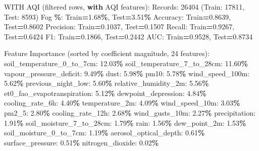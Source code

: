 \documentclass[
  letterpaper,
  DIV=11,
  numbers=noendperiod]{scrartcl}
\newenvironment{Shaded}{\begin{snugshade}}{\end{snugshade}}
\newcommand{\BuiltInTok}[1]{#1}
\newcommand{\ControlFlowTok}[1]{\textcolor[rgb]{0.13,0.29,0.53}{\textbf{#1}}}
\newcommand{\DecValTok}[1]{\textcolor[rgb]{0.00,0.00,0.81}{#1}}
\newcommand{\FloatTok}[1]{\textcolor[rgb]{0.00,0.00,0.81}{#1}}
\newcommand{\NormalTok}[1]{#1}
\newcommand{\OperatorTok}[1]{\textcolor[rgb]{0.81,0.36,0.00}{\textbf{#1}}}
\begin{document}
\begin{Shaded}
\begin{Highlighting}[]
\NormalTok{WITH AQI (filtered rows, }\ControlFlowTok{with}\NormalTok{ AQI features):}
\NormalTok{  Records: }\DecValTok{26404}\NormalTok{ (Train: }\DecValTok{17811}\NormalTok{, Test: }\DecValTok{8593}\NormalTok{)}
\NormalTok{  Fog }\OperatorTok{\%}\NormalTok{: Train}\OperatorTok{=}\FloatTok{1.68}\OperatorTok{\%}\NormalTok{, Test}\OperatorTok{=}\FloatTok{3.51}\OperatorTok{\%}
\NormalTok{  Accuracy: Train}\OperatorTok{=}\FloatTok{0.8639}\NormalTok{, Test}\OperatorTok{=}\FloatTok{0.8602}
\NormalTok{  Precision: Train}\OperatorTok{=}\FloatTok{0.1037}\NormalTok{, Test}\OperatorTok{=}\FloatTok{0.1507}
\NormalTok{  Recall: Train}\OperatorTok{=}\FloatTok{0.9267}\NormalTok{, Test}\OperatorTok{=}\FloatTok{0.6424}
\NormalTok{  F1: Train}\OperatorTok{=}\FloatTok{0.1866}\NormalTok{, Test}\OperatorTok{=}\FloatTok{0.2442}
\NormalTok{  AUC: Train}\OperatorTok{=}\FloatTok{0.9528}\NormalTok{, Test}\OperatorTok{=}\FloatTok{0.8734}

\NormalTok{  Feature Importance (}\BuiltInTok{sorted}\NormalTok{ by coefficient magnitude, }\DecValTok{24}\NormalTok{ features):}
\NormalTok{    soil\_temperature\_0\_to\_7cm: }\FloatTok{12.03}\OperatorTok{\%}
\NormalTok{    soil\_temperature\_7\_to\_28cm: }\FloatTok{11.60}\OperatorTok{\%}
\NormalTok{    vapour\_pressure\_deficit: }\FloatTok{9.49}\OperatorTok{\%}
\NormalTok{    dust: }\FloatTok{5.98}\OperatorTok{\%}
\NormalTok{    pm10: }\FloatTok{5.78}\OperatorTok{\%}
\NormalTok{    wind\_speed\_100m: }\FloatTok{5.62}\OperatorTok{\%}
\NormalTok{    previous\_night\_low: }\FloatTok{5.60}\OperatorTok{\%}
\NormalTok{    relative\_humidity\_2m: }\FloatTok{5.56}\OperatorTok{\%}
\NormalTok{    et0\_fao\_evapotranspiration: }\FloatTok{5.12}\OperatorTok{\%}
\NormalTok{    dewpoint\_depression: }\FloatTok{4.84}\OperatorTok{\%}
\NormalTok{    cooling\_rate\_6h: }\FloatTok{4.40}\OperatorTok{\%}
\NormalTok{    temperature\_2m: }\FloatTok{4.09}\OperatorTok{\%}
\NormalTok{    wind\_speed\_10m: }\FloatTok{3.03}\OperatorTok{\%}
\NormalTok{    pm2\_5: }\FloatTok{2.80}\OperatorTok{\%}
\NormalTok{    cooling\_rate\_12h: }\FloatTok{2.68}\OperatorTok{\%}
\NormalTok{    wind\_gusts\_10m: }\FloatTok{2.27}\OperatorTok{\%}
\NormalTok{    precipitation: }\FloatTok{1.91}\OperatorTok{\%}
\NormalTok{    soil\_moisture\_7\_to\_28cm: }\FloatTok{1.79}\OperatorTok{\%}
\NormalTok{    rain: }\FloatTok{1.56}\OperatorTok{\%}
\NormalTok{    dew\_point\_2m: }\FloatTok{1.53}\OperatorTok{\%}
\NormalTok{    soil\_moisture\_0\_to\_7cm: }\FloatTok{1.19}\OperatorTok{\%}
\NormalTok{    aerosol\_optical\_depth: }\FloatTok{0.61}\OperatorTok{\%}
\NormalTok{    surface\_pressure: }\FloatTok{0.51}\OperatorTok{\%}
\NormalTok{    nitrogen\_dioxide: }\FloatTok{0.02}\OperatorTok{\%}


\end{Highlighting}
\end{Shaded}
\end{document}
